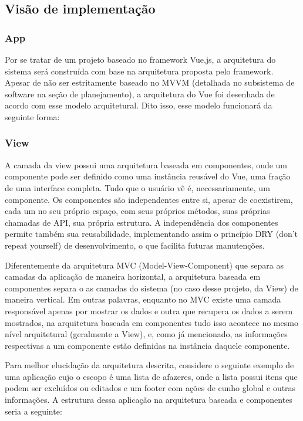\begin{apendicesenv}
\subsection{Visão de implementação}

\subsubsection{App}
Por se tratar de um projeto baseado no framework Vue.js, a arquitetura do sistema será construída com base na arquitetura proposta pelo framework. Apesar de não ser estritamente baseado no MVVM (detalhada no subsistema de software na seção de planejamento), a arquitetura do Vue foi desenhada de acordo com esse modelo arquitetural. Dito isso, esse modelo funcionará da seguinte forma:

\subsubsection{View}
A camada da view possui uma arquitetura baseada em componentes, onde um componente pode ser definido como uma instância reusável do Vue, uma fração de uma interface completa. Tudo que o usuário vê é, necessariamente, um componente. Os componentes são independentes entre si, apesar de coexistirem, cada um no seu próprio espaço, com seus próprios métodos, suas próprias chamadas de API, sua própria estrutura. A independência dos componentes permite também sua reusabilidade, implementando assim o princípio DRY (don't repeat yourself) de desenvolvimento, o que facilita futuras manutenções.

Diferentemente da arquitetura MVC (Model-View-Component) que separa as camadas da aplicação de maneira horizontal, a arquitetura baseada em componentes separa o as camadas do sistema (no caso desse projeto, da View) de maneira vertical. Em outras palavras, enquanto no MVC existe uma camada responsável apenas por mostrar os dados e outra que recupera os dados a serem mostrados, na arquitetura baseada em componentes tudo isso acontece no mesmo nível arquitetural (geralmente a View), e, como já mencionado, as informações respectivas a um componente estão definidas na instância daquele componente. 

Para melhor elucidação da arquitetura descrita, considere o seguinte exemplo de uma aplicação cujo o escopo é uma lista de afazeres, onde a lista possui itens que podem ser excluídos ou editados e um footer com ações de cunho global e outras informações. A estrutura dessa aplicação na arquitetura baseada e componentes seria a seguinte:


\end{apendicesenv}
